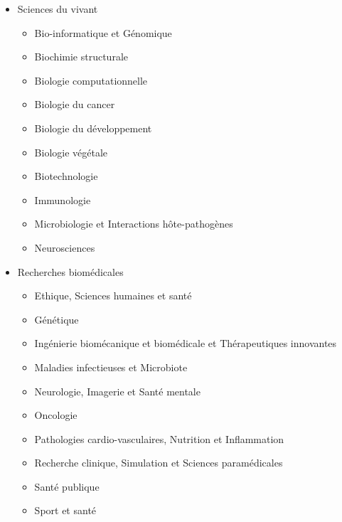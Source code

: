     \label{ed-658-sciences-du-vivant}

		\begin{itemize}
        \item Sciences du vivant
		    \begin{itemize}
            \item Bio-informatique et Génomique
            \item Biochimie structurale
            \item Biologie computationnelle
            \item Biologie du cancer
            \item Biologie du développement
            \item Biologie végétale
            \item Biotechnologie
            \item Immunologie
            \item Microbiologie et Interactions hôte-pathogènes
            \item Neurosciences
		    \end{itemize}
		\end{itemize}

    \label{ed-659-recherches-iomédicales}

		\begin{itemize}
            \item Recherches biomédicales
            \begin{itemize}
            \item Ethique, Sciences humaines et santé
            \item Génétique
            \item Ingénierie biomécanique et biomédicale et Thérapeutiques innovantes
            \item Maladies infectieuses et Microbiote
            \item Neurologie, Imagerie et Santé mentale
            \item Oncologie
            \item Pathologies cardio-vasculaires, Nutrition et Inflammation
            \item Recherche clinique, Simulation et Sciences paramédicales
            \item Santé publique
            \item Sport et santé
		    \end{itemize}
		\end{itemize}